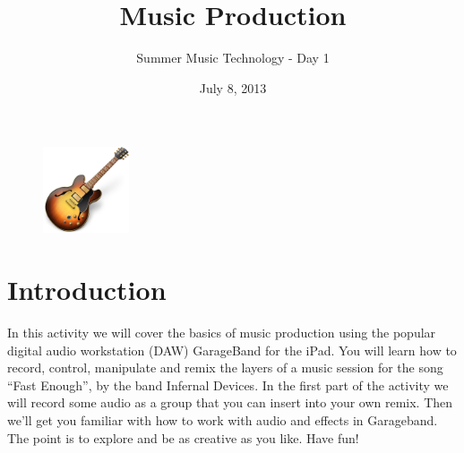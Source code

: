 \documentclass[12pt]{article}
\title{\textbf{Music Production}}
\author{Summer Music Technology - Day 1}
\date{July 8, 2013} %
\begin{document}
\maketitle

\begin{figure}[h]
   \centering
   \includegraphics[width=1in]{fig/garageband.png}
   \label{fig:garagebaned}
\end{figure}

\section{Introduction}

In this activity we will cover the basics of music production using the popular digital audio workstation (DAW) GarageBand for the iPad. You will learn how to record, control, manipulate and remix the layers of a music session for the song ``Fast Enough'', by the band Infernal Devices. In the first part of the activity we will record some audio as a group that you can insert into your own remix. Then we'll get you familiar with how to work with audio and effects in Garageband. The point is to explore and be as creative as you like. Have fun!
\end{document}
